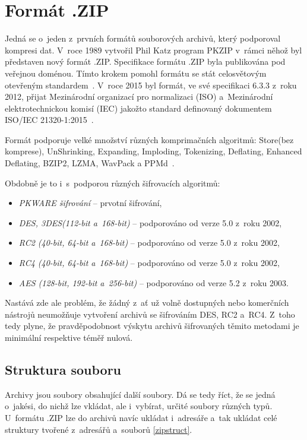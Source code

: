 \section{Formát .ZIP}
Jedná se o~jeden z~prvních formátů souborových archivů, který podporoval kompresi dat. V~roce 1989
vytvořil Phil Katz program PKZIP v~rámci něhož byl představen nový formát .ZIP. Specifikace
formátu .ZIP byla publikována pod veřejnou doménou. Tímto krokem pomohl formátu se stát
celosvětovým otevřeným standardem~\cite{PKWARE:2015}. V~roce 2015 byl formát, ve své specifikaci
6.3.3 z~roku 2012, přijat Mezinárodní organizací pro normalizaci (ISO) a~Mezinárodní
elektrotechnickou komisí (IEC) jakožto standard definovaný dokumentem ISO/IEC
21320-1:2015~\cite{ISOIEC:2015}.

 Formát podporuje velké množství různých komprimačních algoritmů: Store(bez komprese),
UnShrinking, Expanding, Imploding, Tokenizing, Deflating, Enhanced Deflating, BZIP2, LZMA, WavPack
a PPMd~\cite{PKWARE:2014}. 

 Obdobně je to i~s~podporou různých šifrovacích algoritmů:
\begin{itemize}
    \item {\it PKWARE šifrování} -- prvotní šifrování,
    \item {\it DES, 3DES(112-bit a~168-bit)} -- podporováno od verze 5.0 z~roku 2002,
    \item {\it RC2 (40-bit, 64-bit a~168-bit)} -- podporováno od verze 5.0 z~roku 2002,
    \item {\it RC4 (40-bit, 64-bit a~168-bit)} -- podporováno od verze 5.0 z~roku 2002,
    \item {\it AES (128-bit, 192-bit a~256-bit)} -- podporováno od verze 5.2 z~roku 2003.
\end{itemize}
Nastává zde ale problém, že žádný z~ať už volně dostupných nebo komerčních nástrojů
neumožňuje vytvoření archivů se šifrováním DES, RC2 a~RC4. Z~toho tedy plyne, že pravděpodobnost
výskytu archivů šifrovaných těmito metodami je minimální respektive téměř nulová.

\subsection{Struktura souboru}
\label{ssec:zip_struct}
Archivy jsou soubory obsahující další soubory. Dá se tedy říct, že se jedná
o~jakési\linebreak{}, do nichž lze vkládat, ale i~vybírat, určité soubory různých typů.
U~formátu .ZIP lze do archivů navíc ukládat i~adresáře a~tak ukládat
celé struktury tvořené z~adresářů a~souborů \ref{zipstruct}.

